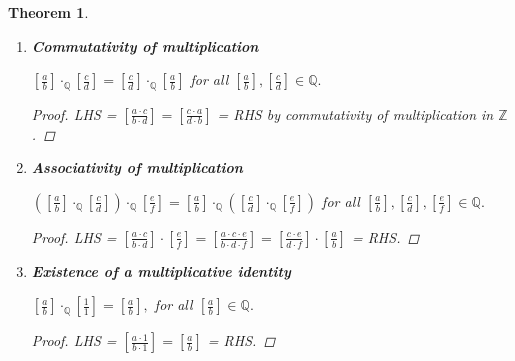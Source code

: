 \documentclass[11pt]{article}
\newcommand{\bbQ}{\mathbb{Q}}
\renewcommand{\_}[1]{\underline{ #1 }}
\newtheorem{theorem}{Theorem}[section]
\theoremstyle{definition}
\newcommand{\Z}{\mathbb{Z}}
\numberwithin{equation}{subsection}
\begin{document}
\begin{theorem}
\begin{enumerate}
\begin{proof}
LHS = $[\frac{a \cdot b + (-a) \cdot b}{b \cdot b}] = [\frac{ab-ab}{b^2}] = [\frac{0}{b^2}] = [\frac{0}{1}]$ = RHS.

\renewcommand\qedsymbol{QED}
\end{proof}

  \item[e)] {\bf Commutativity of multiplication}
  
  $\displaystyle \left[\frac{a}{b}\right]\cdot_{\bbQ} \left[\frac{c}{d}\right] =\left[\frac{c}{d}\right]\cdot_{\bbQ} \left[\frac{a}{b}\right]$ for all $\displaystyle  \left[\frac{a}{b}\right],\left[\frac{c}{d}\right] \in\bbQ.$

\begin{proof}
LHS = $[\frac{a \cdot c}{b \cdot d}] = [\frac{c \cdot a}{d \cdot b}]$ = RHS by commutativity of multiplication in $\Z$.

\renewcommand\qedsymbol{QED}
\end{proof}


  \item[f)] {\bf Associativity of multiplication}
  
   $\displaystyle \left(\left[\frac{a}{b}\right]\cdot_{\bbQ} \left[\frac{c}{d}\right] \right)\cdot_{\bbQ} \left[\frac{e}{f}\right] = 
  \left[\frac{a}{b}\right]\cdot_{\bbQ} \left( \left[\frac{c}{d}\right] \cdot_{\bbQ} \left[\frac{e}{f}\right]\right) $ for all $\displaystyle \left[\frac{a}{b}\right],\left[\frac{c}{d}\right] , \left[\frac{e}{f}\right]\in \bbQ.$ 

\begin{proof}
LHS = $[\frac{a \cdot c}{b \cdot d}] \cdot [\frac{e}{f}] = [\frac{a \cdot c \cdot e}{b \cdot d \cdot f}] = [\frac{c \cdot e}{d \cdot f}] \cdot [\frac{a}{b}]$ = RHS.

\renewcommand\qedsymbol{QED}
\end{proof}

    \item[g)]  {\bf Existence of a multiplicative identity}
    
     $\displaystyle \left[\frac{a}{b}\right] \cdot_{\bbQ}\left[\frac{1}{1}\right]=\left[\frac{a}{b}\right],$ for all $\displaystyle \left[\frac{a}{b}\right] \in\bbQ.$
     
\begin{proof}
LHS = $[\frac{a \cdot 1}{b \cdot 1}] = [\frac{a}{b}]$ = RHS.

\renewcommand\qedsymbol{QED}
\end{proof}


\end{enumerate}
\end{theorem}
\end{document}
